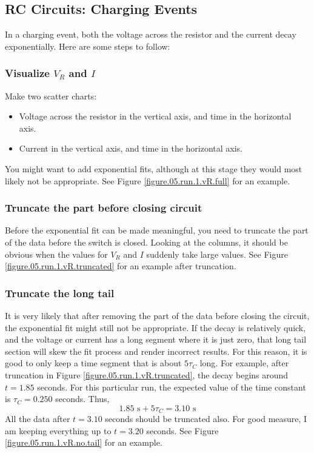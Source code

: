 \subsection{RC Circuits: Charging Events}
%
In a charging event, both the voltage across the resistor and the current decay exponentially. Here are some steps to follow:
%
\subsubsection{Visualize $V_{R}$ and $I$}
%
Make two scatter charts:
\begin{itemize}
    \item Voltage across the resistor in the vertical axis, and time in the horizontal axis.
    \item Current in the vertical axis, and time in the horizontal axis.
\end{itemize}
You might want to add exponential fits, although at this stage they would most likely not be appropriate. See Figure \ref{figure.05.run.1.vR.full} for an example.
%
\subsubsection{Truncate the part before closing circuit}
%
Before the exponential fit can be made meaningful, you need to truncate the part of the data before the switch is closed. Looking at the columns, it should be obvious when the values for $V_{R}$ and $I$ suddenly take large values. See Figure \ref{figure.05.run.1.vR.truncated} for an example after truncation.
%
\subsubsection{Truncate the long tail}
%
It is very likely that after removing the part of the data before closing the circuit, the exponential fit might still not be appropriate. If the decay is relatively quick, and the voltage or current has a long segment where it is just zero, that long tail section will skew the fit process and render incorrect results. For this reason, it is good to only keep a time segment that is about $5\tau_{C}$ long. For example, after truncation in Figure \ref{figure.05.run.1.vR.truncated}, the decay begins around $t = 1.85$ seconds. For this particular run, the expected value of the time constant is $\tau_{C} = 0.250$ seconds. Thus,
\begin{equation}
    1.85 \text{ s} + 5 \tau_{C} = 3.10 \text{ s}
\end{equation}
All the data after $t = 3.10$ seconds should be truncated also. For good measure, I am keeping everything up to $t = 3.20$ seconds. See Figure \ref{figure.05.run.1.vR.no.tail} for an example.
%
